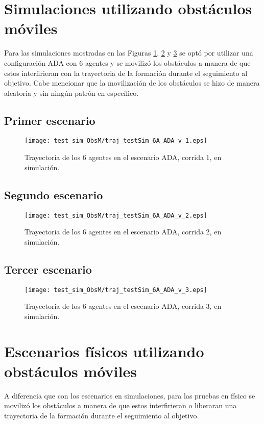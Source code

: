 \newpage
\section{Simulaciones utilizando obstáculos móviles}
Para las simulaciones mostradas en las Figuras \ref{fig:traj_testSim_6A_ADA_v_1}, \ref{fig:traj_testSim_6A_ADA_v_2} y \ref{fig:traj_testSim_6A_ADA_v_3} se optó por utilizar una configuración ADA con 6 agentes y se movilizó los obstáculos a manera de que estos interfirieran con la trayectoria de la formación durante el seguimiento al objetivo. Cabe mencionar que la movilización de los obstáculos se hizo de manera aleatoria y sin ningún patrón en específico. 

\subsection{Primer escenario}
\begin{figure}[H]
	\centering
	\texttt{[image: test\_sim\_ObsM/traj\_testSim\_6A\_ADA\_v\_1.eps]}
	\caption{Trayectoria de los 6 agentes en el escenario ADA, corrida 1, en simulación.}
	\label{fig:traj_testSim_6A_ADA_v_1}
\end{figure}

\subsection{Segundo escenario}
\begin{figure}[H]
	\centering
	\texttt{[image: test\_sim\_ObsM/traj\_testSim\_6A\_ADA\_v\_2.eps]}
	\caption{Trayectoria de los 6 agentes en el escenario ADA, corrida 2, en simulación.}
	\label{fig:traj_testSim_6A_ADA_v_2}
\end{figure}

\subsection{Tercer escenario}
\begin{figure}[H]
	\centering
	\texttt{[image: test\_sim\_ObsM/traj\_testSim\_6A\_ADA\_v\_3.eps]}
	\caption{Trayectoria de los 6 agentes en el escenario ADA, corrida 3, en simulación.}
	\label{fig:traj_testSim_6A_ADA_v_3}
\end{figure}


\section{Escenarios físicos utilizando obstáculos móviles}
A diferencia que con los escenarios en simulaciones, para las pruebas en físico se movilizó los obstáculos a manera de que estos interfirieran o liberaran una trayectoria de la formación durante el seguimiento al objetivo.

